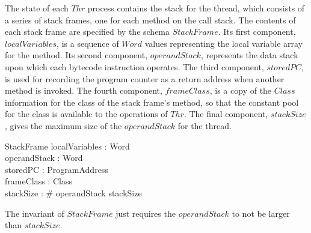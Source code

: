 The state of each $Thr$ process contains the stack for the thread,
which consists of a series of stack frames, one for each method on the
call stack.
The contents of each stack frame are specified by the schema
$StackFrame$.
Its first component, $localVariables$, is a sequence of $Word$ values
representing the local variable array for the method.
Its second component, $operandStack$, represents the data stack upon
which each bytecode instruction operates.
The third component, $storedPC$, is used for recording the program
counter as a return address when another method is invoked.
The fourth component, $frameClass$, is a copy of the $Class$
information for the class of the stack frame's method, so that the
constant pool for the class is available to the operations of $Thr$.
The final component, $stackSize$, gives the maximum size of the
$operandStack$ for the thread.
\begin{schema}{StackFrame}
  localVariables : \seq Word \\
  operandStack : \seq Word \\
  storedPC : ProgramAddress \\
  frameClass : Class \\
  stackSize : \nat
\where
  \# operandStack \leq stackSize
\end{schema}
The invariant of $StackFrame$ just requires the $operandStack$ to not
be larger than $stackSize$.

